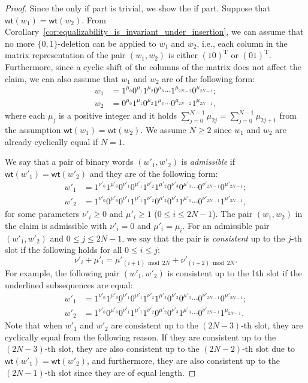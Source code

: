 \documentclass[10pt,a4paper]{amsart}
\newcommand{\wt}{\mathsf{wt}}
\begin{document}
\begin{proof}
    Since the only if part is trivial, we show the if part. 
    Suppose that $\wt(w_1) = \wt(w_2)$. From Corollary~\ref{cor:equalizability_is_invariant_under_insertion}, we can assume that no more $\{0,1\}$-deletion can be applied to $w_1$ and $w_2$, i.e., each column in the matrix representation of the pair $(w_1,w_2)$ is either $(10)^{\mathrm{T}}$ or $(01)^{\mathrm{T}}$.
    Furthermore, since a cyclic shift of the columns of the matrix does not affect the claim, we can also assume that $w_1$ and $w_2$ are of the following form:
    \[
        \begin{split}
            w_1 &= 1^{\mu_0} 0^{\mu_1} 1^{\mu_2} 0^{\mu_3} \cdots 1^{\mu_{2N-2}} 0^{\mu_{2N-1}};\\
            w_2 &= 0^{\mu_0} 1^{\mu_1} 0^{\mu_2} 1^{\mu_3} \cdots 0^{\mu_{2N-2}} 1^{\mu_{2N-1}},
        \end{split}
    \]
    where each $\mu_j$ is a positive integer and it holds $\sum_{j=0}^{N-1} \mu_{2j} = \sum_{j=0}^{N-1} \mu_{2j+1}$ from the assumption $\wt(w_1) = \wt(w_2)$.
    We assume $N \geq 2$ since $w_1$ and $w_2$ are already cyclically equal if $N = 1$. 

    We say that a pair of binary words $(w'_1, w'_2)$ is \emph{admissible} if $\wt(w'_1) = \wt(w'_2)$ and they are of the following form:
    \[
        \begin{split}
            w'_1 &= 1^{\nu'_0} 1^{\mu'_0} 0^{\nu'_1} 0^{\mu'_1} 1^{\nu'_2} 1^{\mu'_2} 0^{\nu'_3} 0^{\mu'_3} \cdots 0^{\nu'_{2N-1}} 0^{\mu'_{2N-1}}; \\
            w'_2 &= 1^{\nu'_0} 0^{\mu'_0} 0^{\nu'_1} 1^{\mu'_1} 1^{\nu'_2} 0^{\mu'_2} 0^{\nu'_3} 1^{\mu'_3} \cdots  0^{\nu'_{2N-1}} 1^{\mu'_{2N-1}},
        \end{split}
    \]
    for some parameters $\nu'_i \geq 0$ and $\mu'_i \geq 1$ ($0 \leq i \leq 2N-1$). 
    The pair $(w_1,w_2)$ in the claim is admissible with $\nu'_i = 0$ and $\mu'_i = \mu_i$. 
    For an admissible pair $(w'_1, w'_2)$ and $0 \leq j \leq 2N-1$, we say that the pair is \emph{consistent} up to the $j$-th slot if the following holds for all $0 \leq i \leq j$:
    \[
    \nu'_i + \mu'_i = \mu'_{(i+1) \bmod 2N} + \nu'_{(i+2) \bmod 2N}.
    \]
    For example, the following pair $(w'_1, w'_2)$ is consistent up to the 1th slot if the underlined subsequences are equal:
    \[
        \begin{split}
            w'_1 &= \underline{1^{\nu'_0} 1^{\mu'_0} 0^{\nu'_1} 0^{\mu'_1}} 1^{\nu'_2} 1^{\mu'_2} 0^{\nu'_3} 0^{\mu'_3} \cdots 0^{\nu'_{2N-1}} 0^{\mu'_{2N-1}}; \\
            w'_2 &= 1^{\nu'_0} 0^{\mu'_0} 0^{\nu'_1} \underline{1^{\mu'_1} 1^{\nu'_2} 0^{\mu'_2} 0^{\nu'_3}} 1^{\mu'_3} \cdots  0^{\nu'_{2N-1}} 1^{\mu_{2N-1}}.
        \end{split}    
    \]
    Note that when $w'_1$ and $w'_2$ are consistent up to the $(2N-3)$-th slot, they are cyclically equal from the following reason. 
    If they are consistent up to the $(2N-3)$-th slot, they are also consistent up to the $(2N-2)$-th slot due to $\wt(w'_1) = \wt(w'_2)$, and furthermore, they are also consistent up to the $(2N-1)$-th slot since they are of equal length. 
    

\end{proof}
\end{document}
